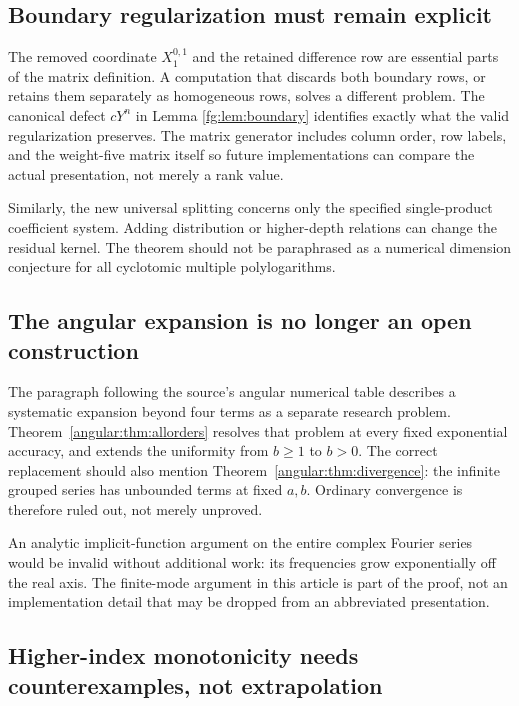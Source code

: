 \documentclass[11pt,a4paper]{article}
\theoremstyle{definition}
\theoremstyle{remark}
\numberwithin{equation}{section}
\begin{document}
\subsection{Boundary regularization must remain explicit}

The removed coordinate $X_1^{0,1}$ and the retained difference row are
essential parts of the matrix definition. A computation that discards
both boundary rows, or retains them separately as homogeneous rows,
solves a different problem. The canonical defect $cY^n$ in Lemma
\ref{fg:lem:boundary} identifies exactly what the valid regularization
preserves. The matrix generator includes column order, row labels, and
the weight-five matrix itself so future implementations can compare
the actual presentation, not merely a rank value.

Similarly, the new universal splitting concerns only the specified
single-product coefficient system. Adding distribution or higher-depth
relations can change the residual kernel. The theorem should not be
paraphrased as a numerical dimension conjecture for all cyclotomic
multiple polylogarithms.

\subsection{The angular expansion is no longer an open construction}

The paragraph following the source's angular numerical table describes
a systematic expansion beyond four terms as a separate research
problem. Theorem~\ref{angular:thm:allorders} resolves that problem at
every fixed exponential accuracy, and extends the uniformity from
$b\geq1$ to $b>0$. The correct replacement should also mention
Theorem~\ref{angular:thm:divergence}: the infinite grouped series has
unbounded terms at fixed $a,b$. Ordinary convergence is therefore
ruled out, not merely unproved.

An analytic implicit-function argument on the entire complex Fourier
series would be invalid without additional work: its frequencies grow
exponentially off the real axis. The finite-mode argument in this
article is part of the proof, not an implementation detail that may
be dropped from an abbreviated presentation.

\subsection{Higher-index monotonicity needs counterexamples, not extrapolation}
\end{document}
